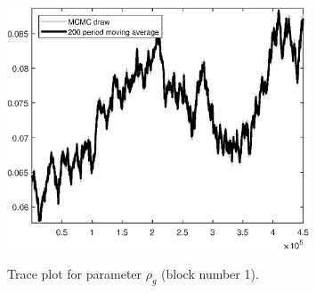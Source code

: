 \begin{figure}[H]
\centering
  \includegraphics[width=0.8\textwidth]{BRS_sectoral_wo_demand_shocks/graphs/TracePlot_rho_g_blck_1}\\
    \caption{Trace plot for parameter ${\rho_g}$ (block number 1).}
\end{figure}
